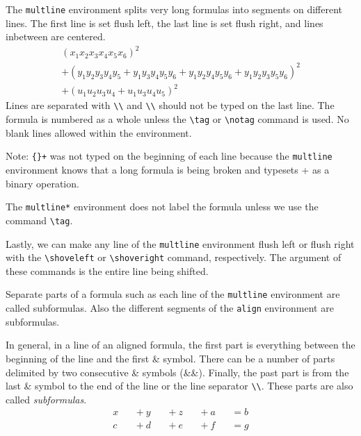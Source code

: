 \documentclass[12pt]{amsart}
\begin{document}
The \texttt{multline} environment splits very long formulas into segments on different lines. The first line is set flush left, the last line is set flush right, and lines inbetween are centered.
\begin{multline}
   \left(x_1 x_2 x_3 x_4 x_5 x_6 \right)^2 \\
   + \left(y_1 y_2 y_3 y_4 y_5 + y_1  y_3 y_4 y_5 y_6 + y_1 y_2  y_4 y_5 y_6 + y_1 y_2 y_3  y_5 y_6 \right)^2 \\
   + \left( u_1 u_2 u_3 u_4 + u_1 u_3 u_4 u_5 \right)^2
\end{multline}
Lines are separated with \verb+\\+ and \verb+\\+ should not be typed on the last line. The formula is numbered as a whole unless the \verb+\tag+ or \verb+\notag+ command is used. No blank lines allowed within the environment. 

Note: \verb&{}+& was not typed on the beginning of each line because the \texttt{multline} environment knows that a long formula is being broken and typesets + as a binary operation. 

The \verb+multline*+ environment does not label the formula unless we use the command \verb+\tag+. 

Lastly, we can make any line of the \verb+multline+ environment flush left or flush right with the \verb+\shoveleft+ or \verb+\shoveright+ command, respectively. The argument of these commands is the entire line being shifted.
\vspace{15 pt}

Separate parts of a formula such as each line of the \verb+multline+ environment are called subformulas. Also the different segments of the \verb+align+ environment are subformulas. 

In general, in a line of an aligned formula, the first part is everything between the beginning of the line and the first \& symbol. There can be a number of parts delimited by two consecutive \& symbols (\&\&). Finally, the past part is from the last \& symbol to the end of the line or the line separator \verb+\\+. These parts are also called \emph{subformulas}. 
\begin{align*}
x  &&{} + y  &&{} + z  &&{} + a  && = b \\
c  &&{} + d  &&{} + e  &&{} + f  &&= g
\end{align*}
\end{document}
